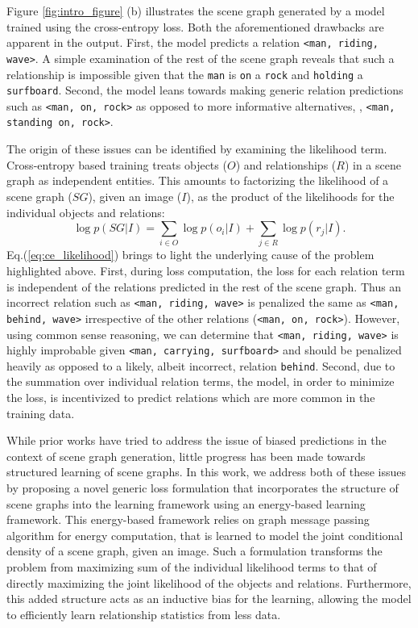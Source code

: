 \documentclass[final]{cvpr}
\begin{document}
Figure \ref{fig:intro_figure} (b) illustrates the scene graph generated by a model \cite{tang2019learning} trained using the cross-entropy loss. Both the aforementioned drawbacks are apparent in the output. First, the model predicts a relation \texttt{<man, riding, wave>}. A simple examination of the rest of the scene graph reveals that such a relationship is impossible given that the \texttt{man} is \texttt{on} a \texttt{rock} and \texttt{holding} a \texttt{surfboard}. Second, the model leans towards making generic relation predictions such as \texttt{<man, on, rock>} as opposed to more informative alternatives, \eg, \texttt{<man, standing on, rock>}. 

The origin of these issues can be identified by examining the likelihood term. Cross-entropy based training treats objects ($O$) and relationships ($R$) in a scene graph as independent entities. This amounts to factorizing the likelihood of a scene graph ($SG$), given an image ($I$), as the product of the likelihoods for the individual objects and relations:
\begin{equation}
    \log p(SG|I) = \sum_{i \in O} \log p(o_i| I) + \sum_{j \in R} \log p(r_j | I).
    \label{eq:ce_likelihood}
\end{equation}
Eq.(\ref{eq:ce_likelihood}) brings to light the underlying cause of the problem highlighted above. First, during loss computation, the loss for each relation term is independent of the relations predicted in the rest of the scene graph.  Thus an incorrect relation such as \texttt{<man, riding, wave>} is penalized the same as \texttt{<man, behind, wave>} irrespective of the other relations (\texttt{<man, on, rock>}). However, using common sense reasoning, we can determine that \texttt{<man, riding, wave>} is highly improbable given \texttt{<man, carrying, surfboard>} and should be penalized heavily as opposed to a likely, albeit incorrect, relation \texttt{behind}. Second, due to the summation over individual relation terms, the model, in order to minimize the loss, is incentivized to predict relations which are more common in the training data.



While prior works have tried to address the issue of biased predictions \cite{Lin_2020_CVPR, tang2020unbiased} in the context of scene graph generation, little progress has been made towards structured learning of scene graphs. 
In this work, we address both of these issues by proposing a novel generic loss formulation that incorporates the structure of scene graphs into the learning framework using an energy-based learning framework. This energy-based framework relies on graph message passing algorithm for energy computation, that is learned to model the joint conditional density of a scene graph, given an image.
Such a formulation transforms the problem from maximizing sum of the individual likelihood terms to that of directly maximizing the joint likelihood of the objects and relations.
Furthermore, this added structure acts as an inductive bias for the learning, allowing the model to efficiently learn relationship statistics from less data. 
\end{document}
